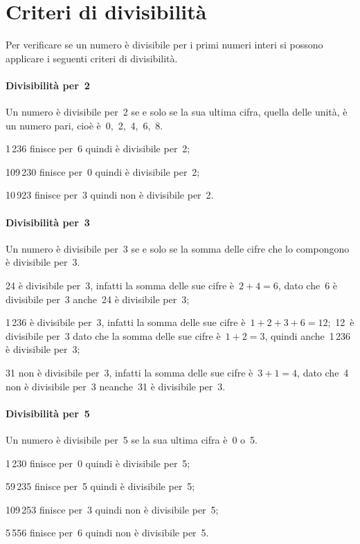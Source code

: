 \section{Criteri di divisibilità}\label{sect:criteri_divisibilita}
Per verificare se un numero è divisibile per i primi numeri interi si possono applicare i seguenti criteri di
divisibilità.

\paragraph{Divisibilità per~2} Un numero è divisibile per~2 se e solo se la sua ultima cifra, quella delle unità,
è un numero pari, cioè è~0,~2,~4,~6,~8.

\begin{itemize*}
 \item 1\,236 finisce per~6 quindi è divisibile per~2;
 \item 109\,230 finisce per~0 quindi è divisibile per~2;
 \item 10\,923 finisce per~3 quindi non è divisibile per~2.
\end{itemize*}

\paragraph{Divisibilità per~3} Un numero è divisibile per~3 se e solo se la somma delle cifre che lo
compongono è divisibile per~3.
\begin{itemize*}
 \item 24 è divisibile per~3, infatti la somma delle sue cifre è~$2+4=6$, dato che~6 è divisibile per~3
anche~24 è divisibile per~3;
 \item 1\,236 è divisibile per~3, infatti la somma delle sue cifre è~$1+2+3+6=12$;~12~è divisibile per~3
dato che la somma delle sue cifre è~$1+2=3$, quindi anche~1\,236 è divisibile per~3;
 \item 31 non è divisibile per~3, infatti la somma delle sue cifre è~$3+1=4$, dato che~4 non è
divisibile per~3 neanche~31 è divisibile per~3.
\end{itemize*}

\paragraph{Divisibilità per~5} Un numero è divisibile per~5 se la sua ultima cifra è~0 o~5.
\begin{itemize*}
 \item 1\,230 finisce per~0 quindi è divisibile per~5;
 \item 59\,235 finisce per~5 quindi è divisibile per~5;
 \item 109\,253 finisce per~3 quindi non è divisibile per~5;
 \item 5\,556 finisce per~6 quindi non è divisibile per~5.
\end{itemize*}

